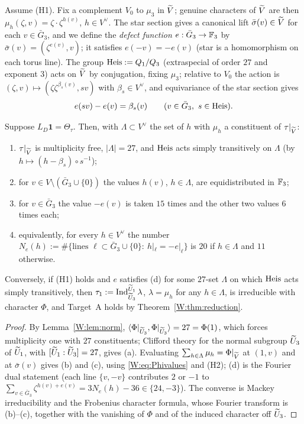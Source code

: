 Assume (H1).  Fix a complement $V_0$ to $\mu_3$ in $\widetilde V$; genuine
characters of $\widetilde V$ are then $\mu_h(\zeta,v)=\zeta\cdot\zeta^{h(v)}$,
$h\in V^\vee$.  The star section gives a canonical lift
$\bar\sigma(v)\in\widetilde V$ for each $v\in\bar G_3$, and we define the
\emph{defect function} $e:\bar G_3\to\mathbb F_3$ by
$\bar\sigma(v)=(\zeta^{e(v)},v)$; it satisfies $e(-v)=-e(v)$
(star is a homomorphism on each torus line).  The group
$\mathrm{Heis}:=Q_1/Q_3$ (extraspecial of order $27$ and exponent $3$) acts on
$\widetilde V$ by conjugation, fixing $\mu_3$; relative to $V_0$ the action is
$(\zeta,v)\mapsto(\zeta\zeta^{\beta_s(v)},sv)$ with $\beta_s\in V^\vee$,
and equivariance of the star section gives
\begin{equation}\label{W:eq:cocycle}
 e(sv)-e(v)=\beta_s(v)\qquad(v\in\bar G_3,\ s\in\mathrm{Heis}).
\end{equation}

\begin{proposition}\label{W:prop:forces}
Suppose $L_D\mathbf1=\Theta_\tau$.  Then, with $\Lambda\subset V^\vee$ the
set of $h$ with $\mu_h$ a constituent of $\tau|_{\widetilde V}$:
\begin{enumerate}[label=(\alph*)]
\item $\tau|_{\widetilde V}$ is multiplicity free, $|\Lambda|=27$, and $\mathrm{Heis}$ acts
simply transitively on $\Lambda$ (by $h\mapsto(h-\beta_s)\circ s^{-1}$);
\item for $v\in V\setminus(\bar G_3\cup\{0\})$ the values $h(v)$, $h\in\Lambda$,
are equidistributed in $\mathbb F_3$;
\item for $v\in\bar G_3$ the value $-e(v)$ is taken $15$ times and the
other two values $6$ times each;
\item equivalently, for every $h\in V^\vee$ the number
$N_e(h):=\#\{\text{lines }\ell\subset\bar G_3\cup\{0\}:\ h|_\ell=-e|_\ell\}$
is $20$ if $h\in\Lambda$ and $11$ otherwise.
\end{enumerate}
Conversely, if (H1) holds and $e$ satisfies (d) for some $27$-set
$\Lambda$ on which $\mathrm{Heis}$ acts simply transitively, then
$\tau_1:=\operatorname{Ind}_{\widetilde U_3}^{\widetilde U_1}\lambda$, $\lambda=\mu_h$ for any $h\in\Lambda$,
is irreducible with character $\Phi$, and Target~A holds by
Theorem~\ref{W:thm:reduction}.
\end{proposition}
\begin{proof}
By Lemma~\ref{W:lem:norm}, $\langle\Phi|_{\widetilde U_3},\Phi|_{\widetilde U_3}\rangle=27=\Phi(1)$,
which forces multiplicity one with $27$ constituents; Clifford theory
for the normal subgroup $\widetilde U_3$ of $\widetilde U_1$, with $[\widetilde U_1:\widetilde U_3]=27$,
gives (a).  Evaluating $\sum_{h\in\Lambda}\mu_h=\Phi|_{\widetilde V}$ at
$(1,v)$ and at $\bar\sigma(v)$ gives (b) and (c), using
\eqref{W:eq:Phivalues} and (H2); (d) is the Fourier dual statement
(each line $\{v,-v\}$ contributes $2$ or $-1$ to
$\sum_{v\in\bar G_3}\zeta^{h(v)+e(v)}=3N_e(h)-36\in\{24,-3\}$).  The
converse is Mackey irreducibility and the Frobenius character formula,
whose Fourier transform is (b)--(c), together with the vanishing of
$\Phi$ and of the induced character off $\widetilde U_3$.
\end{proof}

